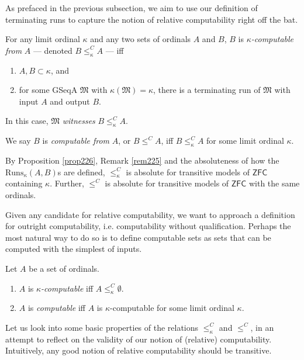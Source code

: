 \documentclass[12pt]{article}
\numberwithin{equation}{section}
\begin{document}
As prefaced in the previous subsection, we aim to use our definition of terminating runs to capture the notion of relative computability right off the bat.

\begin{defi}
For any limit ordinal $\kappa$ and any two sets of ordinals $A$ and $B$, $B$ is $\kappa$\emph{-computable from} $A$ --- denoted $B \leq^C_{\kappa} A$ --- iff
\begin{enumerate}[label=(\alph*)]
    \item $A, B \subset \kappa$, and
    \item for some GSeqA $\mathfrak{M}$ with $\kappa(\mathfrak{M}) = \kappa$, there is a terminating run of $\mathfrak{M}$ with input $A$ and output $B$. 
\end{enumerate}
In this case, $\mathfrak{M}$ \emph{witnesses} $B \leq^C_{\kappa} A$.
\end{defi}

\begin{defi}
We say $B$ is \emph{computable from} $A$, or $B \leq^C A$, iff $B \leq^C_{\kappa} A$ for some limit ordinal $\kappa$.
\end{defi}

By Proposition \ref{prop226}, Remark \ref{rem225} and the absoluteness of how the $\mathrm{Runs}_{\kappa}(A, B)$s are defined, $\leq^C_{\kappa}$ is absolute for transitive models of $\mathsf{ZFC}$ containing $\kappa$. Further, $\leq^C$ is absolute for transitive models of $\mathsf{ZFC}$ with the same ordinals. 

Given any candidate for relative computability, we want to approach a definition for outright computability, i.e. computability without qualification. Perhaps the most natural way to do so is to define computable sets as sets that can be computed with the simplest of inputs. 

\begin{defi}
Let $A$ be a set of ordinals.
\begin{enumerate}[label=(\arabic*)]
    \item $A$ is $\kappa$\emph{-computable} iff $A \leq^C_{\kappa} \emptyset$.
    \item $A$ is \emph{computable} iff $A$ is $\kappa$-computable for some limit ordinal $\kappa$.
\end{enumerate}
\end{defi}

Let us look into some basic properties of the relations $\leq^C_{\kappa}$ and $\leq^C$, in an attempt to reflect on the validity of our notion of (relative) computability. Intuitively, any good notion of relative computability should be transitive. 
\end{document}
